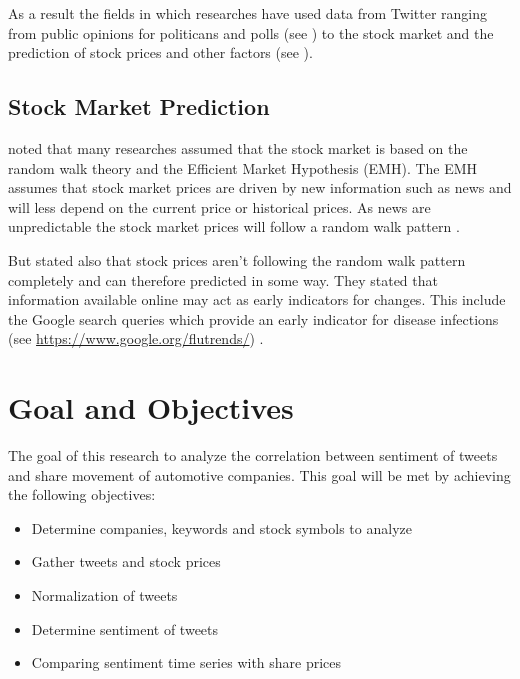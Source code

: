 As a result the fields in which researches have used data from Twitter ranging from public opinions for politicans and polls (see \cite{Oconnor2010a,Patodkar2016a}) to the stock market and the prediction of stock prices and other factors (see \cite{Bollen2011a,Mittal2012a,Nguyen2015a,Pagolu2016a,Zhang2011a}).


\subsection{Stock Market Prediction} 
\label{ss:background-stockmarketprediction}

\citeauthor{Bollen2011a} noted that many researches assumed that the stock market is based on the random walk theory and the Efficient Market Hypothesis (EMH).
The EMH assumes that stock market prices are driven by new information such as news and will less depend on the current price or historical prices.
As news are unpredictable the stock market prices will follow a random walk pattern \cite{Bollen2011a}.

But \citeauthor{Bollen2011a} stated also that stock prices aren't following the random walk pattern completely and can therefore predicted in some way.
They stated that information available online may act as early indicators for changes.
This include the Google search queries which provide an early indicator for disease infections (see \url{https://www.google.org/flutrends/}) \cite{Bollen2011a}.

\section{Goal and Objectives}

The goal of this research to analyze the correlation between sentiment of tweets and share movement of automotive companies.
This goal will be met by achieving the following objectives:

\begin{itemize}
	\item Determine companies, keywords and stock symbols to analyze
	\item Gather tweets and stock prices
  \item Normalization of tweets
  \item Determine sentiment of tweets
  \item Comparing sentiment time series with share prices
\end{itemize}

